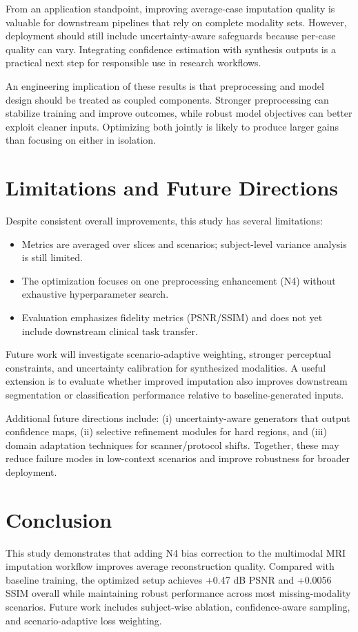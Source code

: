 \documentclass[conference]{IEEEtran}
\begin{document}
From an application standpoint, improving average-case imputation quality is valuable for downstream pipelines that rely on complete modality sets. However, deployment should still include uncertainty-aware safeguards because per-case quality can vary. Integrating confidence estimation with synthesis outputs is a practical next step for responsible use in research workflows.

An engineering implication of these results is that preprocessing and model design should be treated as coupled components. Stronger preprocessing can stabilize training and improve outcomes, while robust model objectives can better exploit cleaner inputs. Optimizing both jointly is likely to produce larger gains than focusing on either in isolation.

\section{Limitations and Future Directions}
Despite consistent overall improvements, this study has several limitations:
\begin{itemize}
\item Metrics are averaged over slices and scenarios; subject-level variance analysis is still limited.
\item The optimization focuses on one preprocessing enhancement (N4) without exhaustive hyperparameter search.
\item Evaluation emphasizes fidelity metrics (PSNR/SSIM) and does not yet include downstream clinical task transfer.
\end{itemize}

Future work will investigate scenario-adaptive weighting, stronger perceptual constraints, and uncertainty calibration for synthesized modalities. A useful extension is to evaluate whether improved imputation also improves downstream segmentation or classification performance relative to baseline-generated inputs.

Additional future directions include: (i) uncertainty-aware generators that output confidence maps, (ii) selective refinement modules for hard regions, and (iii) domain adaptation techniques for scanner/protocol shifts. Together, these may reduce failure modes in low-context scenarios and improve robustness for broader deployment.

\section{Conclusion}
This study demonstrates that adding N4 bias correction to the multimodal MRI imputation workflow improves average reconstruction quality. Compared with baseline training, the optimized setup achieves +0.47 dB PSNR and +0.0056 SSIM overall while maintaining robust performance across most missing-modality scenarios. Future work includes subject-wise ablation, confidence-aware sampling, and scenario-adaptive loss weighting.
\end{document}
